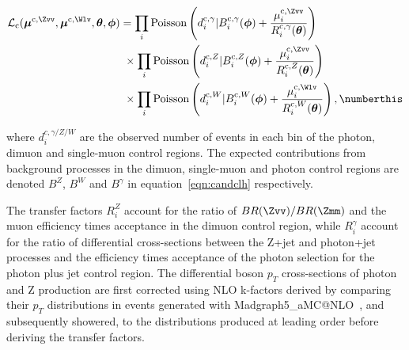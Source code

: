 \begin{align*}
\mathcal{L}_{\textrm{c}}(\boldsymbol{\mu}^{\textrm{c},\Zvv},\boldsymbol{\mu}^{\textrm{c},\Wlv},\boldsymbol{\theta},\boldsymbol{\phi})
&=        \prod_{i} \mathrm{Poisson}\left(d^{\textrm{c},\gamma}_{i}
|B^{\textrm{c},\gamma}_{i}(\boldsymbol{\phi}) +\frac{ \mu^{\textrm{c},\Zvv}_{i}
}{R^{\textrm{c},\gamma}_{i}(\boldsymbol{\theta})}   \right) \\ &~\times
\prod_{i} \mathrm{Poisson}\left(d^{\textrm{c},Z}_{i}
|B^{\textrm{c},Z}_{i}(\boldsymbol{\phi})      +\frac{ \mu^{\textrm{c},\Zvv}_{i}
}{R^{\textrm{c},Z}_{i}     (\boldsymbol{\theta})}       \right ) \\ &~\times
\prod_{i} \mathrm{Poisson}\left(d^{\textrm{c},W}_{i}
|B^{\textrm{c},W}_{i}(\boldsymbol{\phi})      +\frac{ \mu^{\textrm{c},\Wlv}_{i}
}{R^{\textrm{c},W}_{i}     (\boldsymbol{\theta})}       \right),
\numberthis\label{eqn:candclh} \end{align*}

where $d^{c,\gamma/Z/W}_{i}$ are the observed number of events in each bin of
the photon, dimuon and single-muon control regions.  The expected contributions
from background processes in the dimuon, single-muon and photon control regions
are denoted $B^{Z}$, $B^{W}$ and $B^{\gamma}$ in equation~\ref{eqn:candclh}
respectively.

The transfer factors $R^{Z}_{i}$ account for the ratio of $BR(\Zvv)/BR(\Zmm)$
and the muon efficiency times acceptance in the dimuon control region, while
$R^{\gamma}_{i}$ account for the ratio of differential cross-sections between
the Z+jet and photon+jet processes and the efficiency times acceptance of the
photon selection for the photon plus jet control region. The differential boson
$p_{T}$ cross-sections of photon and Z production are first corrected using NLO
k-factors derived by  comparing their $p_{T}$ distributions in events generated
with Madgraph5\_aMC@NLO~\cite{amcatnlo}, and subsequently showered,  to the
distributions produced at leading order before deriving the transfer factors. 

